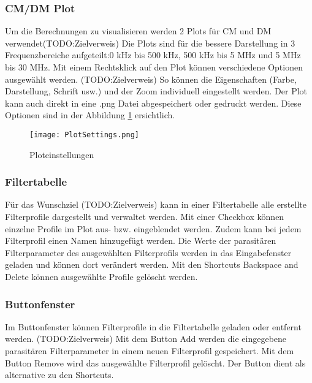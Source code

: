 \subsubsection{CM/DM Plot} \label{subsubsec:CM_DMplot}

Um die Berechnungen zu visualisieren werden 2 Plots für CM und DM verwendet(TODO:Zielverweis) Die Plots sind für die bessere Darstellung in 3 Frequenzbereiche aufgeteilt:0 kHz bis 500 kHz, 500 kHz bis 5 MHz und 5 MHz bis 30 MHz. Mit einem Rechtsklick auf den Plot können verschiedene Optionen ausgewählt werden. (TODO:Zielverweis) So können die Eigenschaften (Farbe, Darstellung, Schrift usw.) und der Zoom individuell eingestellt werden. Der Plot kann auch direkt in eine .png Datei abgespeichert oder gedruckt werden. Diese Optionen sind in der Abbildung \ref{fig:PlotSettings} ersichtlich.

\begin{figure}[H]
	\centering
	\texttt{[image: PlotSettings.png]}
	\caption{Ploteinstellungen}
	\label{fig:PlotSettings}
\end{figure} 


\subsubsection{Filtertabelle} \label{subsubsec:filtertabelle}

Für das Wunschziel (TODO:Zielverweis) kann in einer Filtertabelle alle erstellte Filterprofile dargestellt und verwaltet werden.  Mit einer Checkbox können einzelne Profile im Plot aus- bzw. eingeblendet werden. Zudem kann bei jedem Filterprofil einen Namen hinzugefügt werden. Die Werte der parasitären Filterparameter des ausgewählten Filterprofils werden in das Eingabefenster geladen und können dort verändert werden. Mit den Shortcuts Backspace and Delete können ausgewählte Profile gelöscht werden.

\subsubsection{Buttonfenster} \label{subsubsec:buttonfenster}

Im Buttonfenster können Filterprofile in die Filtertabelle geladen oder entfernt werden. (TODO:Zielverweis) Mit dem Button Add werden die eingegebene parasitären Filterparameter in einem neuen Filterprofil gespeichert. Mit dem Button Remove wird das ausgewählte Filterprofil gelöscht. Der Button dient als alternative zu den Shortcuts.


